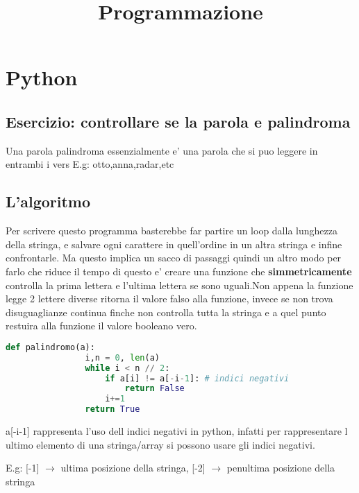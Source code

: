 \documentclass{article}
\title{Programmazione}
\begin{document}
    \section{Python}
    \subsection{Esercizio: controllare se la parola e palindroma}
    \begin{flushleft}
       Una parola palindroma essenzialmente e' una parola che si puo leggere in entrambi i vers E.g: otto,anna,radar,etc
       \subsection{L'algoritmo}
       \begin{flushleft}
        Per scrivere questo programma basterebbe far partire un loop dalla lunghezza della stringa, e salvare ogni carattere in quell'ordine
        in un altra stringa e infine confrontarle. Ma questo implica un sacco di passaggi quindi un altro modo per farlo che riduce il tempo
        di questo e' creare una funzione che \textbf{simmetricamente} controlla la prima lettera e l'ultima lettera se sono uguali.Non appena
        la funzione legge 2 lettere diverse ritorna il valore falso alla funzione, invece se non trova disuguaglianze continua finche non controlla
        tutta la stringa e a quel punto restuira alla funzione il valore booleano vero.\\
        \begin{lstlisting}[language=Python]
            def palindromo(a):
                i,n = 0, len(a)
                while i < n // 2:
                    if a[i] != a[-i-1]: # indici negativi
                        return False
                    i+=1
                return True
        \end{lstlisting}
        a[-i-1] rappresenta l'uso dell indici negativi in python, infatti per rappresentare l ultimo elemento di una stringa/array
        si possono usare gli indici negativi.
        \begin{flushleft}
            E.g: [-1] $\to$ ultima posizione della stringa, [-2] $\to$ penultima posizione della stringa
        \end{flushleft}

\end{flushleft}
\end{flushleft}
\end{document}
